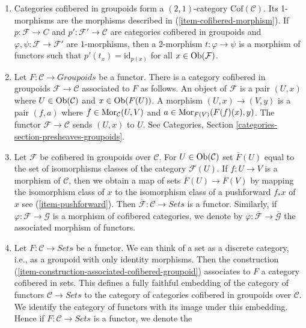 \begin{remarks}
\begin{enumerate}
\item
\label{item-definition-cofibered-groupoids-2-category}
Categories cofibered in groupoids form a $(2, 1)$-category
$\text{Cof}(\mathcal{C})$. Its 1-morphisms are the morphisms described in
(\ref{item-cofibered-morphism}). If $p: \mathcal{F} \to C$ and
$p': \mathcal{F}' \to \mathcal{C}$ are categories cofibered in groupoids
and $\varphi, \psi: \mathcal{F} \to \mathcal{F}'$ are $1$-morphisms, then
a 2-morphism $t: \varphi \to \psi$ is a morphism of functors such that
$p'(t_x) = \text{id}_{p(x)}$ for all $x \in \mathop{\rm Ob}\nolimits(\mathcal{F})$.
\item
\label{item-construction-associated-cofibered-groupoid}
Let $F : \mathcal{C} \to \textit{Groupoids}$ be a functor. There
is a category cofibered in groupoids $\mathcal{F} \to \mathcal{C}$
associated to $F$ as follows. An object of $\mathcal{F}$ is a pair $(U, x)$
where $U \in \mathop{\rm Ob}\nolimits(\mathcal{C})$ and $x \in \mathop{\rm Ob}\nolimits(F(U))$. A
morphism $(U, x) \to (V, y)$ is a pair $(f, a)$ where
$f \in \mathop{\rm Mor}\nolimits_\mathcal{C}(U, V)$ and
$a \in \mathop{\rm Mor}\nolimits_{F(V)}(F(f)(x), y)$.
The functor $\mathcal{F} \to \mathcal{C}$ sends $(U, x)$ to $U$. See
Categories, Section \ref{categories-section-presheaves-groupoids}.
\item Let $\mathcal{F}$ be cofibered in groupoids over $\mathcal{C}$.
For $U \in \mathop{\rm Ob}\nolimits(\mathcal{C})$ set $\overline{F}(U)$ equal to
the set of isomorphisms classes of the category $\mathcal{F}(U)$.
If $f : U \to V$ is a morphism of $\mathcal{C}$, then we obtain a
map of sets $\overline{F}(U) \to \overline{F}(V)$ by mapping the
isomorphism class of $x$ to the isomorphism class of a pushforward
$f_*x$ of $x$ see (\ref{item-pushforward}). Then
$\overline{\mathcal{F}} : \mathcal{C} \to \textit{Sets}$ is a
functor. Similarly, if $\varphi: \mathcal{F} \to \mathcal{G}$ is a
morphism of cofibered categories, we denote by
$\overline{\varphi}: \overline{\mathcal{F}} \to  \overline{\mathcal{G}}$
the associated morphism of functors.
\item
\label{item-convention-cofibered-sets}
Let $F: \mathcal{C} \to \textit{Sets}$ be a functor. We can think of a
set as a discrete category, i.e., as a groupoid with only identity morphisms.
Then the construction (\ref{item-construction-associated-cofibered-groupoid})
associates to $F$ a category cofibered in sets. This defines a fully
faithful embedding of the category of functors $\mathcal{C} \to \textit{Sets}$
to the category of categories cofibered in groupoids over $\mathcal{C}$.
We identify the category of functors with its image under this embedding.
Hence if $F : \mathcal{C} \to \textit{Sets}$ is a functor, we denote the

\end{enumerate}
\end{remarks}
